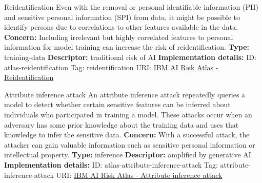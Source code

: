 \begin{definitionbox}{Reidentification}
Even with the removal or personal identifiable information (PII) and sensitive personal information (SPI) from data, it might be possible to identify persons due to correlations to other features available in the data.\newline\newline
\textbf{Concern: }Including irrelevant but highly correlated features to personal information for model training can increase the risk of reidentification.\newline\newline
\textbf{Type: }training-data\newline
\textbf{Descriptor: }traditional risk of AI \newline\newline
\textbf{Implementation details: } \newline
ID: atlas-reidentification \newline
Tag: reidentification \newline
URI:  \href{https://www.ibm.com/docs/en/watsonx/saas?topic=SSYOK8/wsj/ai-risk-atlas/reidentification.html}{IBM AI Risk Atlas - Reidentification}\newline
\end{definitionbox}
\begin{definitionbox}{Attribute inference attack}
An attribute inference attack repeatedly queries a model to detect whether certain sensitive features can be inferred about individuals who participated in training a model. These attacks occur when an adversary has some prior knowledge about the training data and uses that knowledge to infer the sensitive data.\newline\newline
\textbf{Concern: }With a successful attack, the attacker can gain valuable information such as sensitive personal information or intellectual property.\newline\newline
\textbf{Type: }inference\newline
\textbf{Descriptor: }amplified by generative AI \newline\newline
\textbf{Implementation details: } \newline
ID: atlas-attribute-inference-attack \newline
Tag: attribute-inference-attack \newline
URI:  \href{https://www.ibm.com/docs/en/watsonx/saas?topic=SSYOK8/wsj/ai-risk-atlas/attribute-inference-attack.html}{IBM AI Risk Atlas - Attribute inference attack}\newline
\end{definitionbox}
